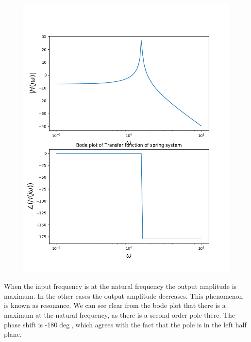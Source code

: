 \documentclass[11pt, a4paper]{article}
\begin{document}
\begin{figure}[!tbh]
   	\centering
   	\includegraphics[scale=0.5]{img4.png}
   	\label{fig:32}
   \end{figure}
{
When the input frequency is at the natural frequency the output amplitude is maximum.
In the other cases the output amplitude decreases.
This phenomenon is known as resonance.
We can see clear from the bode plot that there is a maximum at the natural frequency, as there is a second order pole there.
The phase shift is -180$\deg$, which agrees with the fact that the pole is in the left half plane.
}
\end{document}
